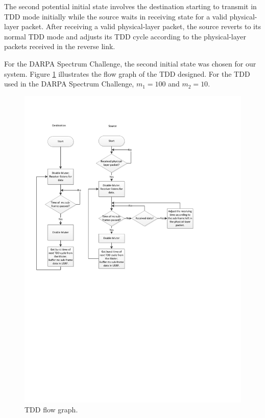 The second potential initial state involves the destination starting to transmit in TDD mode initially while the source waits in receiving state for a valid physical-layer packet. After receiving a valid physical-layer packet, the source reverts to its normal TDD mode and adjusts its TDD cycle according to the physical-layer packets received in the reverse link.

For the DARPA Spectrum Challenge, the second initial state was chosen for our system. Figure \ref{fig:TDDflowchart} illustrates the flow graph of the TDD designed. For the TDD used in the DARPA Spectrum Challenge, $m_1=100$ and $m_2=10$.
\begin{figure}[tpb]
  \begin{center}
    \centerline{\includegraphics[width=160mm]{TDDflowchart.pdf}}
    \caption{TDD flow graph.}
    \label{fig:TDDflowchart}
  \end{center}
\end{figure}
